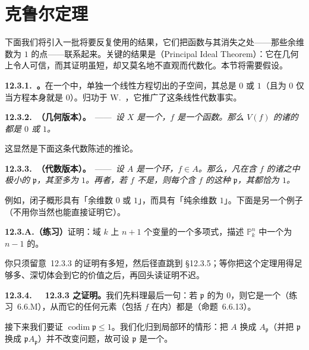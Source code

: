 
\section{克鲁尔定理}

下面我们将引入一批将要反复使用的结果，它们把函数与其消失之处——那些余维数为 $1$ 的点——联系起来。关键的结果是\trKrull{}\trPrincipalIdealTheorem（Principal Ideal Theorem）：它在几何上令人可信，而其证明虽短，却又莫名地不直观而代数化。本节将需要\trNoetherian{}假设。

\textbf{12.3.1.\ \trKrull{}\trPrincipalIdealTheorem。}\quad 在一个\trVectorSpace{}中，单独一个线性方程切出的子空间，其\trCodimension{}总是 $0$ 或 $1$（且\trCodimension{}为 $0$ 仅当方程本身就是 $0$）。\trPrincipalIdealTheorem{}归功于 W.~\trKrull，它推广了这条线性代数事实。

\textbf{12.3.2.\ \trKrull{}\trPrincipalIdealTheorem（几何版本）。}\ ——\ \emph{设 $X$ 是一个\trLocally\trNoetherian\trScheme，$f$ 是一个函数。那么 $V(f)$ 的诸\trIrreducibleComponent{}的\trCodimension{}都是 $0$ 或 $1$。}

这显然是下面这条代数陈述的推论。

\textbf{12.3.3.\ \trKrull{}\trPrincipalIdealTheorem（代数版本）。}\ ——\ \emph{设 $A$ 是一个\trNoetherian{}环，$f\in A$。那么，凡在含 $f$ 的诸\trPrimeIdeal{}之中极小的 $\mathfrak{p}$，其\trCodimension{}至多为 $1$。再者，若 $f$ 不是\trZerodivisor，则每个含 $f$ 的这种 $\mathfrak{p}$，其\trCodimension{}都恰为 $1$。}

例如，\trLocallyPrincipal{}闭子概形具有「余维数 $0$ 或 $1$」，而\trEffectiveCartierDivisor{}具有「纯余维数 $1$」。下面是另一个例子（不用\trPrincipalIdealTheorem{}你当然也能直接证明它）。

\textbf{12.3.A.（练习）}\quad 证明：域 $k$ 上 $n+1$ 个变量的一个\trIrreducible\trHomogeneous{}多项式，描述 $\mathbb{P}^n_k$ 中一个\trDimension{}为 $n-1$ 的\trIntegral\trScheme。

你只须留意\trhTheorem{}~12.3.3 的证明有多短，然后径直跳到 \S12.3.5；等你把这个定理用得足够多、深切体会到它的价值之后，再回头读证明不迟。

\textbf{12.3.4.}\ \extrahard\ \textbf{\trKrull{}\trPrincipalIdealTheorem~12.3.3 之证明。}\quad 我们先料理最后一句：若 $\mathfrak{p}$ 的\trCodimension{}为 $0$，则它是一个\trAssociatedPrimeIdeal（\mbox{练习~6.6.M}），从而它的任何元素（包括 $f$ 在内）都是\trZerodivisor（命题~6.6.13）。

接下来我们要证 $\operatorname{codim}\mathfrak{p}\le1$。我们化归到局部环的情形：把 $A$ 换成 $A_{\mathfrak{p}}$（并把 $\mathfrak{p}$ 换成 $\mathfrak{p}A_{\mathfrak{p}}$）并不改变问题，故可设 $\mathfrak{p}$ 是一个\trMaximalIdeal。

